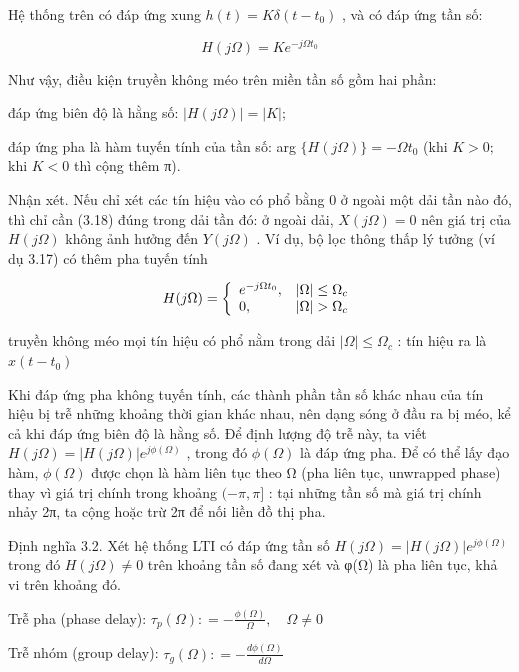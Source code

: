 \documentclass[
  10
]{article}
\begin{document}
Hệ thống trên có đáp ứng xung \(h ( t ) = K \delta ( t - t _ { 0 } )\) ,
và có đáp ứng tần số:

\[
H (j \Omega) = K e ^ {- j \Omega t _ {0}}\tag{3.18}
\]

Như vậy, điều kiện truyền không méo trên miền tần số gồm hai phần:

đáp ứng biên độ là hằng số: \(| H ( j \Omega ) | = | K | ;\)

đáp ứng pha là hàm tuyến tính của tần số: arg
\(\{ H ( j \Omega ) \} = - \Omega t _ { 0 }\) (khi \(K > 0 ;\) khi
\(K < 0\) thì cộng thêm π).

Nhận xét. Nếu chỉ xét các tín hiệu vào có phổ bằng 0 ở ngoài một dải tần
nào đó, thì chỉ cần (3.18) đúng trong dải tần đó: ở ngoài dải,
\(X ( j \Omega ) = 0\) nên giá trị của \(H ( j \Omega )\) không ảnh
hưởng đến \(Y ( j \Omega )\) . Ví dụ, bộ lọc thông thấp lý tưởng (ví dụ
3.17) có thêm pha tuyến tính

\[
H (j \Omega) = \left\{ \begin{array}{l l} e ^ {- j \Omega t _ {0}}, & | \Omega | \leq \Omega_ {c} \\ 0, & | \Omega | > \Omega_ {c} \end{array} \right.
\]

truyền không méo mọi tín hiệu có phổ nằm trong dải
\(| \Omega | \leq \Omega _ { c }\) : tín hiệu ra là
\(x ( t - t _ { 0 } )\)

Khi đáp ứng pha không tuyến tính, các thành phần tần số khác nhau của
tín hiệu bị trễ những khoảng thời gian khác nhau, nên dạng sóng ở đầu ra
bị méo, kể cả khi đáp ứng biên độ là hằng số. Để định lượng độ trễ này,
ta viết
\(H ( j \Omega ) = | H ( j \Omega ) | e ^ { j \phi ( \Omega ) }\) ,
trong đó \(\phi ( \Omega )\) là đáp ứng pha. Để có thể lấy đạo hàm,
\(\phi ( \Omega )\) được chọn là hàm liên tục theo Ω (pha liên tục,
unwrapped phase) thay vì giá trị chính trong khoảng \(( - \pi , \pi ]\)
: tại những tần số mà giá trị chính nhảy 2π, ta cộng hoặc trừ 2π để nối
liền đồ thị pha.

Định nghĩa 3.2. Xét hệ thống LTI có đáp ứng tần số
\(H ( j \Omega ) = | H ( j \Omega ) | e ^ { j \phi ( \Omega ) }\) trong
đó \(H ( j \Omega ) \ne 0\) trên khoảng tần số đang xét và φ(Ω) là pha
liên tục, khả vi trên khoảng đó.

Trễ pha (phase delay):
\(\tau _ { p } ( \Omega ) : = - \frac { \phi ( \Omega ) } { \Omega } , \quad \Omega \neq 0\)

Trễ nhóm (group delay):
\(\tau _ { g } ( \Omega ) : = - \frac { d \phi ( \Omega ) } { d \Omega }\)
\end{document}
